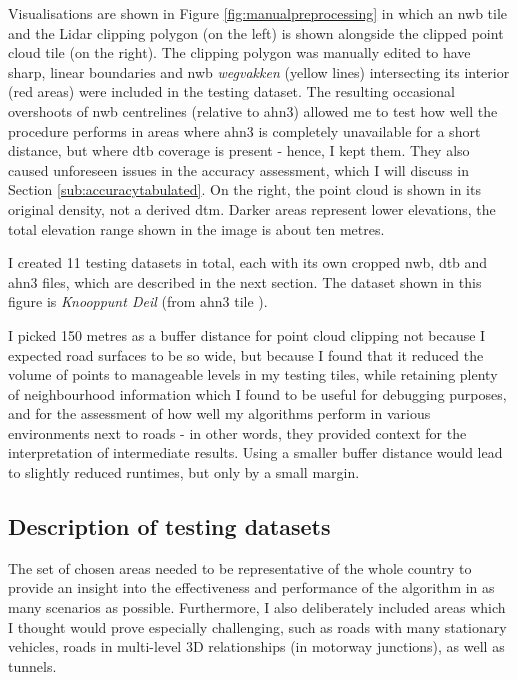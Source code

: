 Visualisations are shown in Figure \ref{fig:manualpreprocessing} in which an \ac{nwb} tile and the Lidar clipping polygon (on the left) is shown alongside the clipped point cloud tile (on the right). The clipping polygon was manually edited to have sharp, linear boundaries and \ac{nwb} \textit{wegvakken} (yellow lines) intersecting its interior (red areas) were included in the testing dataset. The resulting occasional overshoots of \ac{nwb} centrelines (relative to \ac{ahn3}) allowed me to test how well the procedure performs in areas where \ac{ahn3} is completely unavailable for a short distance, but where \ac{dtb} coverage is present - hence, I kept them. They also caused unforeseen issues in the accuracy assessment, which I will discuss in Section \ref{sub:accuracytabulated}. On the right, the point cloud is shown in its original density, not a derived \ac{dtm}. Darker areas represent lower elevations, the total elevation range shown in the image is about ten metres.

I created 11 testing datasets in total, each with its own cropped \ac{nwb}, \ac{dtb} and \ac{ahn3} files, which are described in the next section. The dataset shown in this figure is \textit{Knooppunt Deil} (from \ac{ahn3} tile ).

I picked 150 metres as a buffer distance for point cloud clipping not because I expected road surfaces to be so wide, but because I found that it reduced the volume of points to manageable levels in my testing tiles, while retaining plenty of neighbourhood information which I found to be useful for debugging purposes, and for the assessment of how well my algorithms perform in various environments next to roads - in other words, they provided context for the interpretation of intermediate results. Using a smaller buffer distance would lead to slightly reduced runtimes, but only by a small margin.

\subsection{Description of testing datasets}
\label{sub:testingdata}

The set of chosen areas needed to be representative of the whole country to provide an insight into the effectiveness and performance of the algorithm in as many scenarios as possible. Furthermore, I also deliberately included areas which I thought would prove especially challenging, such as roads with many stationary vehicles, roads in multi-level 3D relationships (in motorway junctions), as well as tunnels.

